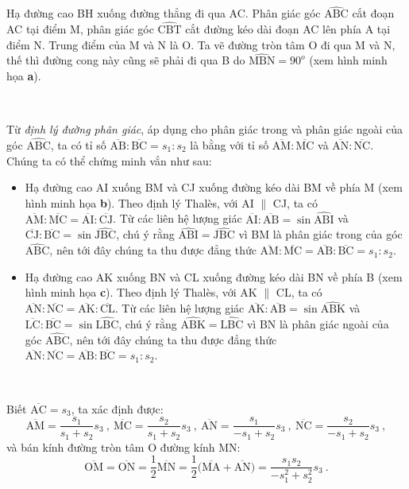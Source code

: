 Hạ đường cao BH xuống đường thẳng đi qua AC. Phân giác góc $\widehat{\text{ABC}}$ cắt đoạn AC tại điểm M, phân giác góc $\widehat{\text{CBT}}$ cắt đường kéo dài đoạn AC lên phía A tại điểm N. Trung điểm của M và N là O. Ta vẽ đường tròn tâm O đi qua M và N, thế thì đường cong này cũng sẽ phải đi qua B do $\widehat{\text{MBN}}=90^o$ (xem hình minh họa \textbf{a}). 

\ \
 
Từ \textit{định lý đường phân giác}, áp dụng cho phân giác trong và phân giác ngoài của góc $\widehat{\text{ABC}}$, ta có tỉ số $\overline{\text{AB}}:\overline{\text{BC}} = s_1:s_2$ là bằng với tỉ số $\overline{\text{AM}}:\overline{\text{MC}}$ và $\overline{\text{AN}}:\overline{\text{NC}}$. Chúng ta có thể chứng minh vắn như sau: 
 \begin{itemize}
     \item Hạ đường cao AI xuống BM và CJ xuống đường kéo dài BM về phía M (xem hình minh họa \textbf{b}). Theo định lý Thalès, với AI $\parallel$ CJ, ta có $\overline{\text{AM}}:\overline{\text{MC}} = \overline{\text{AI}}:\overline{\text{CJ}}$. Từ các liên hệ lượng giác $\overline{\text{AI}}:\overline{\text{AB}}=\sin \widehat{\text{ABI}}$ và $\overline{\text{CJ}}:\overline{\text{BC}}=\sin \widehat{\text{JBC}}$, chú ý rằng $\widehat{\text{ABI}}=\widehat{\text{JBC}}$ vì BM là phân giác trong của góc $\widehat{\text{ABC}}$, nên tới đây chúng ta thu được đẳng thức $\overline{\text{AM}}:\overline{\text{MC}}=\overline{\text{AB}}:\overline{\text{BC}}=s_1:s_2$.
     \item Hạ đường cao AK xuống BN và CL xuống đường kéo dài BN về phía B (xem hình minh họa \textbf{c}). Theo định lý Thalès, với AK $\parallel$ CL, ta có $\overline{\text{AN}}:\overline{\text{NC}} = \overline{\text{AK}}:\overline{\text{CL}}$. Từ các liên hệ lượng giác $\overline{\text{AK}}:\overline{\text{AB}}=\sin \widehat{\text{ABK}}$ và $\overline{\text{LC}}:\overline{\text{BC}}=\sin \widehat{\text{LBC}}$, chú ý rằng $\widehat{\text{ABK}}=\widehat{\text{LBC}}$ vì BN là phân giác ngoài của góc $\widehat{\text{ABC}}$, nên tới đây chúng ta thu được đẳng thức $\overline{\text{AN}}:\overline{\text{NC}}=\overline{\text{AB}}:\overline{\text{BC}}=s_1:s_2$.
 \end{itemize}

 \ \ 

Biết $\overline{\text{AC}}=s_3$, ta xác định được:
\begin{equation}
\overline{\text{AM}}=\frac{s_1}{s_1+s_2}s_3 \ , \ \overline{\text{MC}}=\frac{s_2}{s_1+s_2}s_3 \ , \ \overline{\text{AN}}=\frac{s_1}{-s_1+s_2}s_3 \ , \ \overline{\text{NC}}=\frac{s_2}{-s_1+s_2}s_3 \ ,
\label{distance}
\end{equation}
và bán kính đường tròn tâm O đường kính MN:
\begin{equation}
\overline{\text{OM}} = \overline{\text{ON}} = \frac12 \overline{\text{MN}} = \frac12 \Big( \overline{\text{MA}} + \overline{\text{AN}} \Big) = \frac{s_1 s_2}{-s_1^2 + s_2^2} s_3 \ .
\label{radius}
\end{equation}

